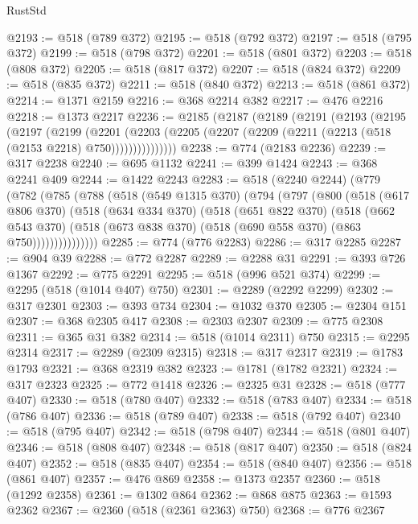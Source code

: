 \begin{lexlean}{RustStd}
\begin{coremodule}
{\begin{coremodule}
{{{{{{{{{{{{{{{{{{{{{{{{{{{{{{{{{{{{{{{{{{{{{{{{{{@2193 := @518 (@789 @372)
@2195 := @518 (@792 @372)
@2197 := @518 (@795 @372)
@2199 := @518 (@798 @372)
@2201 := @518 (@801 @372)
@2203 := @518 (@808 @372)
@2205 := @518 (@817 @372)
@2207 := @518 (@824 @372)
@2209 := @518 (@835 @372)
@2211 := @518 (@840 @372)
@2213 := @518 (@861 @372)
@2214 := @1371 @2159
@2216 := @368 @2214 @382
@2217 := @476 @2216
@2218 := @1373 @2217
@2236 := @2185
    (@2187
      (@2189
        (@2191
          (@2193
            (@2195
              (@2197
                (@2199
                  (@2201
                    (@2203
                      (@2205 (@2207 (@2209 (@2211 (@2213 (@518 (@2153 @2218) @750)))))))))))))))
@2238 := @774 (@2183 @2236)
@2239 := @317 @2238
@2240 := @695 @1132
@2241 := @399 @1424
@2243 := @368 @2241 @409
@2244 := @1422 @2243
@2283 := @518
    (@2240 @2244)
    (@779
      (@782
        (@785
          (@788
            (@518
              (@549 @1315 @370)
              (@794
                (@797
                  (@800
                    (@518
                      (@617 @806 @370)
                      (@518
                        (@634 @334 @370)
                        (@518
                          (@651 @822 @370)
                          (@518
                            (@662 @543 @370)
                            (@518 (@673 @838 @370) (@518 (@690 @558 @370) (@863 @750)))))))))))))))
@2285 := @774 (@776 @2283)
@2286 := @317 @2285
@2287 := @904 @39
@2288 := @772 @2287
@2289 := @2288 @31
@2291 := @393 @726 @1367
@2292 := @775 @2291
@2295 := @518 (@996 @521 @374)
@2299 := @2295 (@518 (@1014 @407) @750)
@2301 := @2289 (@2292 @2299)
@2302 := @317 @2301
@2303 := @393 @734
@2304 := @1032 @370
@2305 := @2304 @151
@2307 := @368 @2305 @417
@2308 := @2303 @2307
@2309 := @775 @2308
@2311 := @365 @31 @382
@2314 := @518 (@1014 @2311) @750
@2315 := @2295 @2314
@2317 := @2289 (@2309 @2315)
@2318 := @317 @2317
@2319 := @1783 @1793
@2321 := @368 @2319 @382
@2323 := @1781 (@1782 @2321)
@2324 := @317 @2323
@2325 := @772 @1418
@2326 := @2325 @31
@2328 := @518 (@777 @407)
@2330 := @518 (@780 @407)
@2332 := @518 (@783 @407)
@2334 := @518 (@786 @407)
@2336 := @518 (@789 @407)
@2338 := @518 (@792 @407)
@2340 := @518 (@795 @407)
@2342 := @518 (@798 @407)
@2344 := @518 (@801 @407)
@2346 := @518 (@808 @407)
@2348 := @518 (@817 @407)
@2350 := @518 (@824 @407)
@2352 := @518 (@835 @407)
@2354 := @518 (@840 @407)
@2356 := @518 (@861 @407)
@2357 := @476 @869
@2358 := @1373 @2357
@2360 := @518 (@1292 @2358)
@2361 := @1302 @864
@2362 := @868 @875
@2363 := @1593 @2362
@2367 := @2360 (@518 (@2361 @2363) @750)
@2368 := @776 @2367
}}}}}}}}}}}}}}}}}}}}}}}}}}}}}}}}}}}}}}}}}}}}}}}}}}
\end{coremodule}}
\end{coremodule}
\end{lexlean}
